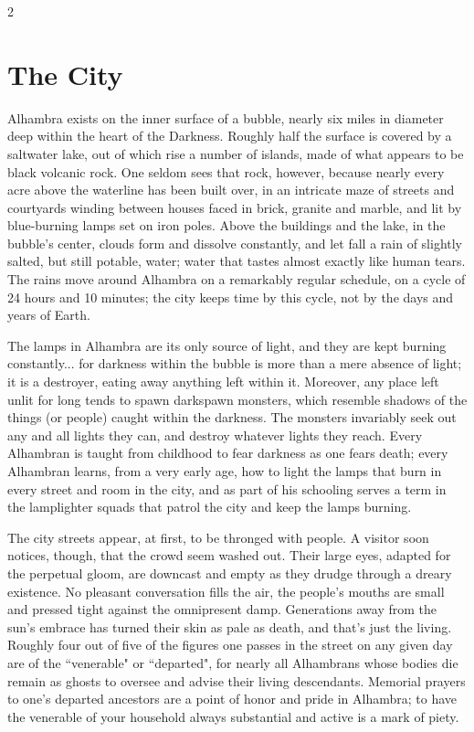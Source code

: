 
\label{cha:Alhambra}


\begin{multicols}{2}\raggedcolumns

\section*{The City}

Alhambra exists on the inner surface of a bubble, nearly six miles in diameter deep within the heart of the Darkness. Roughly half the surface is covered by a saltwater lake, out of which rise a number of islands, made of what appears to be black volcanic rock. One seldom sees that rock, however, because nearly every acre above the waterline has been built over, in an intricate maze of streets and courtyards winding between houses faced in brick, granite and marble, and lit by blue-burning lamps set on iron poles. Above the buildings and the lake, in the bubble's center, clouds form and dissolve constantly, and let fall a rain of slightly salted, but still potable, water; water that tastes almost exactly like human tears. The rains move around Alhambra on a remarkably regular schedule, on a cycle of 24 hours and 10 minutes; the city keeps time by this cycle, not by the days and years of Earth.

The lamps in Alhambra are its only source of light, and they are kept burning constantly... for darkness within the bubble is more than a mere absence of light; it is a destroyer, eating away anything left within it.  Moreover, any place left unlit for long tends to spawn darkspawn monsters, which resemble shadows of the things (or people) caught within the darkness.  The monsters invariably seek out any and all lights they can, and destroy whatever lights they reach.  Every Alhambran is taught from childhood to fear darkness as one fears death; every Alhambran learns, from a very early age, how to light the lamps that burn in every street and room in the city, and as part of his schooling serves a term in the lamplighter squads that patrol the city and keep the lamps burning.

The city streets appear, at first, to be thronged with people. A visitor soon notices, though, that the crowd seem washed out. Their large eyes, adapted for the perpetual gloom, are downcast and empty as they drudge through a dreary existence. No pleasant conversation fills the air, the people's mouths are small and pressed tight against the omnipresent damp. Generations away from the sun's embrace has turned their skin as pale as death, and that's just the living. Roughly four out of five of the figures one passes in the street on any given day are of the \textquotedblleft venerable" or \textquotedblleft departed", for nearly all Alhambrans whose bodies die remain as ghosts to oversee and advise their living descendants. Memorial prayers to one's departed ancestors are a point of honor and pride in Alhambra; to have the venerable of your household always substantial and active is a mark of piety.


\end{multicols}
